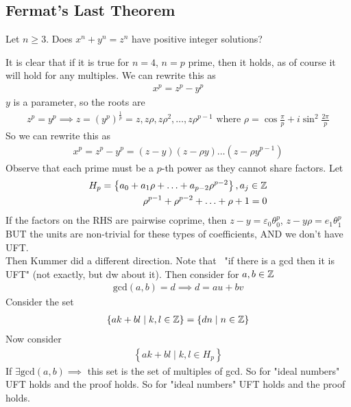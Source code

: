 \documentclass{memoir}
\begin{document}
\subsection{Fermat's Last Theorem}
\label{subsec:fermat_s_last_theorem}
\begin{thm}
	Let \(n\geq 3\). Does \(x^{n}+y^{n}=z^{n}\) have positive integer solutions?
\end{thm}
It is clear that if it is true for \(n  = 4\), \(n= p\) prime, then it holds, as of course it will hold for any multiples. We can rewrite this as
\begin{align*}
	x^{p} = z^{p}-y^{p}
\end{align*}
\(y\) is a parameter, so the roots are
\begin{align*}
	z^{p} = y^{p} \implies z = (y^{p})^{\frac{1}{p}} = z, z\rho, z\rho^2,\ldots,z\rho^{p-1} \text{ where } \rho = \cos \frac{\pi}{p} + i \sin^2 \frac{2\pi}{p}
\end{align*}
So we can rewrite this as
\begin{align*}
	x^{p} = z^{p}-y^{p} = (z-y)(z-\rho y)\ldots(z-\rho y^{p-1})
\end{align*}
Observe that each prime must be a \(p\)-th power as they cannot share factors. Let
\begin{align*}
	H_p = \left\{ a_0 + a_1\rho + \ldots + a_{p-2}\rho^{p-2} \right\}, a_j \in \mathbb{Z} \\
	\rho^{p-1}+\rho^{p-2} + \ldots + \rho + 1 = 0
\end{align*}
If the factors on the RHS are pairwise coprime, then \(z-y = \varepsilon_0 \theta_0^{p}\), \(z-y\rho = e_1 \theta_1^{p}\)
BUT the units are non-trivial for these types of coefficients, AND we don't have UFT.\\

Then Kummer did a different direction. Note that ~"if there is a gcd then it is UFT" (not exactly, but dw about it). Then consider for \(a,b \in \mathbb{Z}\)
\begin{align*}
	\textrm{gcd}(a,b) = d \implies d = au + bv
\end{align*}
Consider the set
\begin{align*}
	\left\{ak + bl \mid k,l \in \mathbb{Z} \right\} = \left\{dn \mid n \in \mathbb{Z} \right\} 
\end{align*}
Now consider
\begin{align*}
	\left\{ak + bl \mid k,l \in H_p \right\} 
\end{align*}
If \( \exists \textrm{gcd}(a,b) \implies\) this set is the set of multiples of gcd. So for "ideal numbers" UFT holds and the proof holds. So for "ideal numbers" UFT holds and the proof holds.
\end{document}
